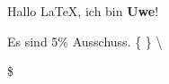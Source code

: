 \documentclass{article}
\begin{document}
Hallo \LaTeX, ich bin \textbf{Uwe}! %

Es sind 5\% Ausschuss. \{  \} \textbackslash 

\blindtext[5]  \$

\texteuro
\end{document}
